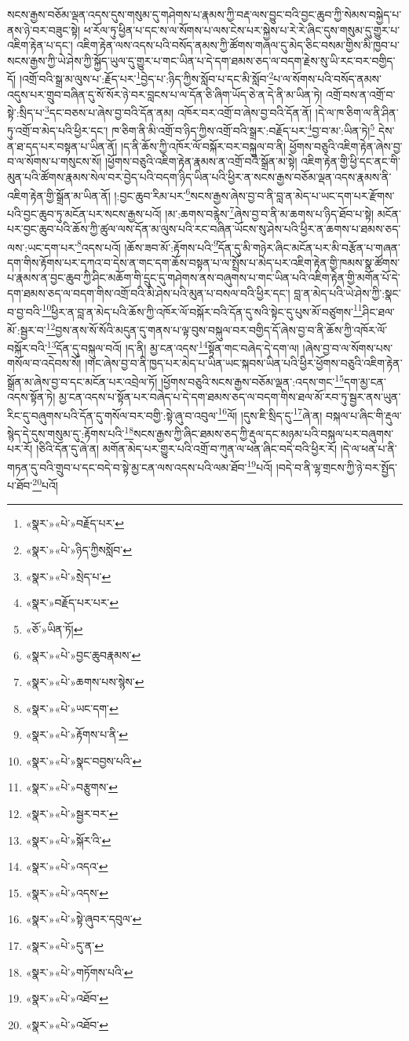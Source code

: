 སངས་རྒྱས་བཅོམ་ལྡན་འདས་དུས་གསུམ་དུ་གཤེགས་པ་རྣམས་ཀྱི་བརྡ་ལས་བྱུང་བའི་བྱང་ཆུབ་ཀྱི་སེམས་བསྐྱེད་པ་ནས་ཉེ་བར་བཟུང་སྟེ། ཕ་རོལ་ཏུ་ཕྱིན་པ་དང་ས་ལ་སོགས་པ་ལས་ངེས་པར་སྐྱེས་པ་རེ་རེ་ཞིང་དུས་གསུམ་དུ་གྱུར་པ་འཇིག་རྟེན་པ་དང་། འཇིག་རྟེན་ལས་འདས་པའི་བསོད་ནམས་ཀྱི་ཚོགས་གཞལ་དུ་མེད་ཅིང་བསམ་གྱིས་མི་ཁྱབ་པ་སངས་རྒྱས་ཀྱི་ཡེ་ཤེས་ཀྱི་སྐྱོད་ཡུལ་དུ་གྱུར་པ་གང་ཡིན་པ་དེ་དག་ཐམས་ཅད་ལ་བདག་རྗེས་སུ་ཡི་རང་བར་བགྱིད་དོ། །འགྲོ་བའི་སྒྲ་མ་ལུས་པ་:རྗོད་པར་\footnote{«སྣར་»«པེ་»བརྗོད་པར་}བྱེད་པ་:ཉིད་ཀྱིས་སློབ་པ་དང་མི་སློབ་\footnote{«སྣར་»«པེ་»ཉིད་ཀྱིསསློབ་}པ་ལ་སོགས་པའི་བསོད་ནམས་འདུས་པར་གྲུབ་བཞིན་དུ་སོ་སོར་ཉེ་བར་བླངས་པ་ལ་དོན་ཅི་ཞིག་ཡོད་ཅེ་ན་དེ་ནི་མ་ཡིན་ཏེ། འགྲོ་བས་ན་འགྲོ་བ་སྟེ་:སྲིད་པ་\footnote{«སྣར་»«པེ་»སྲེད་པ་}དང་བཅས་པ་ཞེས་བྱ་བའི་དོན་ནམ། འཁོར་བར་འགྲོ་བ་ཞེས་བྱ་བའི་དོན་ནོ། །དེ་ལ་ཁ་ཅིག་ལ་ནི་ཤིན་ཏུ་འགྲོ་བ་མེད་པའི་ཕྱིར་དང་། ཁ་ཅིག་ནི་མི་འགྲོ་བ་ཉིད་ཀྱིས་འགྲོ་བའི་སྒྲར་:བརྗོད་པར་\footnote{«སྣར་»བརྗོད་པར་པར་}བྱ་བ་མ་:ཡིན་ཏེ།\footnote{«ཅོ་»ཡིན་ཏོ།} དེས་ན་ཐ་དད་པར་བསྟན་པ་ཡིན་ནོ། །ད་ནི་ཆོས་ཀྱི་འཁོར་ལོ་བསྐོར་བར་བསྐུལ་བ་ནི། ཕྱོགས་བཅུའི་འཇིག་རྟེན་ཞེས་བྱ་བ་ལ་སོགས་པ་གསུངས་སོ། །ཕྱོགས་བཅུའི་འཇིག་རྟེན་རྣམས་ན་འགྲོ་བའི་སྒྲོན་མ་སྟེ། འཇིག་རྟེན་གྱི་ཕྱི་དང་ནང་གི་མུན་པའི་ཚོགས་རྣམས་སེལ་བར་བྱེད་པའི་བདག་ཉིད་ཡིན་པའི་ཕྱིར་ན་སངས་རྒྱས་བཅོམ་ལྡན་འདས་རྣམས་ནི་འཇིག་རྟེན་གྱི་སྒྲོན་མ་ཡིན་ནོ། །:བྱང་ཆུབ་རིམ་པར་\footnote{«སྣར་»«པེ་»བྱང་ཆུབརྣམས་}སངས་རྒྱས་ཞེས་བྱ་བ་ནི་བླ་ན་མེད་པ་ཡང་དག་པར་རྫོགས་པའི་བྱང་ཆུབ་ཏུ་མངོན་པར་སངས་རྒྱས་པའོ། །མ་:ཆགས་བརྙེས་\footnote{«སྣར་»«པེ་»ཆགས་པས་སྙེས་}ཞེས་བྱ་བ་ནི་མ་ཆགས་པ་ཉིད་ཐོབ་པ་སྟེ། མངོན་པར་བྱང་ཆུབ་པའི་ཆོས་ཀྱི་ཚུལ་ལས་དོན་མ་ལུས་པའི་རང་བཞིན་ཡོངས་སུ་ཤེས་པའི་ཕྱིར་ན་ཆགས་པ་ཐམས་ཅད་ལས་:ཡང་དག་པར་\footnote{«སྣར་»«པེ་»ཡང་དག་}འདས་པའོ། །ཆོས་ཟབ་མོ་:རྟོགས་པའི་\footnote{«སྣར་»«པེ་»རྟོགས་པ་ནི་}དོན་དུ་མི་གཉེར་ཞིང་མངོན་པར་མི་བརྩོན་པ་གཞན་དག་གིས་རྟོགས་པར་དཀའ་བ་དེས་ན་གང་དག་ཆོས་བསྟན་པ་ལ་སྤྲོས་པ་མེད་པར་འཇིག་རྟེན་གྱི་ཁམས་སྣ་ཚོགས་པ་རྣམས་ན་བྱང་ཆུབ་ཀྱི་ཤིང་མཆོག་གི་དྲུང་དུ་གཤེགས་ནས་བཞུགས་པ་གང་ཡིན་པའི་འཇིག་རྟེན་གྱི་མགོན་པོ་དེ་དག་ཐམས་ཅད་ལ་བདག་གིས་འགྲོ་བའི་མི་ཤེས་པའི་མུན་པ་བསལ་བའི་ཕྱིར་དང་། བླ་ན་མེད་པའི་ཡེ་ཤེས་ཀྱི་:སྣང་བ་བྱ་བའི་\footnote{«སྣར་»«པེ་»སྣང་བབྱས་པའི་}ཕྱིར་ན་བླ་ན་མེད་པའི་ཆོས་ཀྱི་འཁོར་ལོ་བསྐོར་བའི་དོན་དུ་སའི་སྟེང་དུ་པུས་མོ་བཙུགས་\footnote{«སྣར་»«པེ་»བརྩུགས་}ཤིང་ཐལ་མོ་:སྦྱར་བ་\footnote{«སྣར་»«པེ་»སྦྱར་བར་}བྱས་ནས་སོ་སོའི་མདུན་དུ་གནས་པ་ལྟ་བུས་བསྐུལ་བར་བགྱིད་དོ་ཞེས་བྱ་བ་ནི་ཆོས་ཀྱི་འཁོར་ལོ་བསྐོར་བའི་\footnote{«སྣར་»«པེ་»སྐོར་འི་}དོན་དུ་བསྐུལ་བའོ། །ད་ནི། མྱ་ངན་འདས་\footnote{«སྣར་»«པེ་»འདའ་}སྟོན་གང་བཞེད་དེ་དག་ལ། །ཞེས་བྱ་བ་ལ་སོགས་པས་གསོལ་བ་འདེབས་སོ། །གང་ཞེས་བྱ་བ་ནི་ཁྱད་པར་མེད་པ་ཡིན་ཡང་སྐབས་ཡིན་པའི་ཕྱིར་ཕྱོགས་བཅུའི་འཇིག་རྟེན་སྒྲོན་མ་ཞེས་བྱ་བ་དང་མངོན་པར་འབྲེལ་ཏོ། །ཕྱོགས་བཅུའི་སངས་རྒྱས་བཅོམ་ལྡན་:འདས་གང་\footnote{«སྣར་»«པེ་»འདས་}དག་མྱ་ངན་འདས་སྟོན་ཏེ། མྱ་ངན་འདས་པ་སྟོན་པར་བཞེད་པ་དེ་དག་ཐམས་ཅད་ལ་བདག་གིས་ཐལ་མོ་རབ་ཏུ་སྦྱར་ནས་ཡུན་རིང་དུ་བཞུགས་པའི་དོན་དུ་གསོལ་བར་བགྱི་:སྟེ་ཞུ་བ་འབུལ་\footnote{«སྣར་»«པེ་»སྟེ་ཞུབར་དབུལ་}ལོ། །དུས་ཇི་སྲིད་དུ་\footnote{«སྣར་»«པེ་»དུ་ན་}ཞེ་ན། བསྐལ་པ་ཞིང་གི་རྡུལ་སྙེད་དེ་དུས་གསུམ་དུ་:རྟོགས་པའི་\footnote{«སྣར་»«པེ་»གཏོགས་པའི་}སངས་རྒྱས་ཀྱི་ཞིང་ཐམས་ཅད་ཀྱི་རྡུལ་དང་མཉམ་པའི་བསྐལ་པར་བཞུགས་པར་རོ། །ཅིའི་དོན་དུ་ཞེ་ན། མགོན་མེད་པར་གྱུར་པའི་འགྲོ་བ་ཀུན་ལ་ཕན་ཞིང་བདེ་བའི་ཕྱིར་རོ། །དེ་ལ་ཕན་པ་ནི་གཏན་དུ་བའི་གྲུབ་པ་དང་བདེ་བ་སྟེ་མྱ་ངན་ལས་འདས་པའི་ལམ་ཐོབ་\footnote{«སྣར་»«པེ་»འཐོབ་}པའོ། །བདེ་བ་ནི་ལྷ་གྲངས་ཀྱི་ཉེ་བར་སྤྱོད་པ་ཐོབ་\footnote{«སྣར་»«པེ་»འཐོབ་}པའོ། 